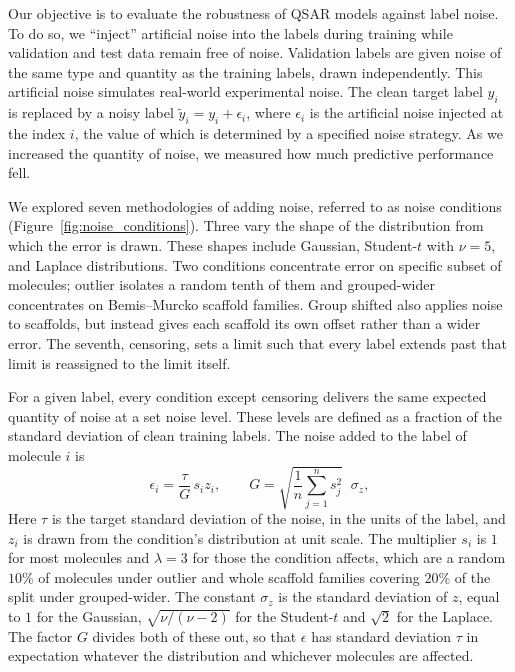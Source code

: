 Our objective is to evaluate the robustness of QSAR models against label noise. To do so, we ``inject'' artificial noise into the labels during training while validation and test data remain free of noise. Validation labels are given noise of the same type and quantity as the training labels, drawn independently. This artificial noise simulates real-world experimental noise. The clean target label $y_i$ is replaced by a noisy label $\tilde{y}_i = y_i + \epsilon_i$, where $\epsilon_i$ is the artificial noise injected at the index $i$, the value of which is determined by a specified noise strategy. As we increased the quantity of noise, we measured how much predictive performance fell. 

We explored seven methodologies of adding noise, referred to as noise conditions (Figure~\ref{fig:noise_conditions}). Three vary the shape of the distribution from which the error is drawn. These shapes include Gaussian, Student-$t$ with $\nu = 5$, and Laplace distributions. Two conditions concentrate error on specific subset of molecules; outlier isolates a random tenth of them and grouped-wider concentrates on Bemis--Murcko scaffold families. Group shifted also applies noise to scaffolds, but instead gives each scaffold its own offset rather than a wider error. The seventh, censoring, sets a limit such that every label extends past that limit is reassigned to the limit itself. 

For a given label, every condition except censoring delivers the same expected quantity of noise at a set noise level. These levels are defined as a fraction of the standard deviation of clean training labels. The noise added to the label of molecule $i$ is
\begin{equation}
\epsilon_i = \frac{\tau}{G}\,s_i z_i,
\qquad
G = \sqrt{\frac{1}{n}\sum_{j=1}^{n} s_j^{2}}\;\;\sigma_z,
\label{eq:dose_matching}
\end{equation}
Here $\tau$ is the target standard deviation of the noise, in the units of the label, and $z_i$ is
drawn from the condition's distribution at unit scale. The multiplier $s_i$ is $1$ for most
molecules and $\lambda = 3$ for those the condition affects, which are a random $10\%$ of molecules
under outlier and whole scaffold families covering $20\%$ of the split under grouped-wider. The
constant $\sigma_z$ is the standard deviation of $z$, equal to $1$ for the Gaussian,
$\sqrt{\nu/(\nu-2)}$ for the Student-$t$ and $\sqrt{2}$ for the Laplace. The factor $G$ divides both
of these out, so that $\epsilon$ has standard deviation $\tau$ in expectation whatever the
distribution and whichever molecules are affected.


